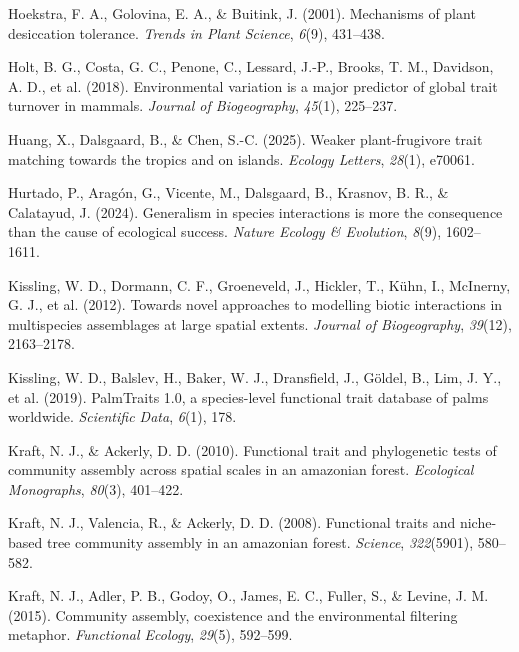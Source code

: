 \documentclass[
]{agujournal2019}
\newlength{\cslhangindent}
\newenvironment{CSLReferences}[2] %
 {\begin{list}{}{%
  \setlength{\itemindent}{0pt}
  \setlength{\leftmargin}{0pt}
  \setlength{\parsep}{0pt}
  \ifodd #1
   \setlength{\leftmargin}{\cslhangindent}
   \setlength{\itemindent}{-1\cslhangindent}
  \fi
  \setlength{\itemsep}{#2\baselineskip}}}
 {\end{list}}
\begin{document}
\begin{CSLReferences}{1}{0}
Hoekstra, F. A., Golovina, E. A., \& Buitink, J. (2001). Mechanisms of
plant desiccation tolerance. \emph{Trends in Plant Science},
\emph{6}(9), 431--438.

Holt, B. G., Costa, G. C., Penone, C., Lessard, J.-P., Brooks, T. M.,
Davidson, A. D., et al. (2018). Environmental variation is a major
predictor of global trait turnover in mammals. \emph{Journal of
Biogeography}, \emph{45}(1), 225--237.

Huang, X., Dalsgaard, B., \& Chen, S.-C. (2025). Weaker plant-frugivore
trait matching towards the tropics and on islands. \emph{Ecology
Letters}, \emph{28}(1), e70061.

Hurtado, P., Aragón, G., Vicente, M., Dalsgaard, B., Krasnov, B. R., \&
Calatayud, J. (2024). Generalism in species interactions is more the
consequence than the cause of ecological success. \emph{Nature Ecology
\& Evolution}, \emph{8}(9), 1602--1611.

Kissling, W. D., Dormann, C. F., Groeneveld, J., Hickler, T., Kühn, I.,
McInerny, G. J., et al. (2012). Towards novel approaches to modelling
biotic interactions in multispecies assemblages at large spatial
extents. \emph{Journal of Biogeography}, \emph{39}(12), 2163--2178.

Kissling, W. D., Balslev, H., Baker, W. J., Dransfield, J., Göldel, B.,
Lim, J. Y., et al. (2019). PalmTraits 1.0, a species-level functional
trait database of palms worldwide. \emph{Scientific Data}, \emph{6}(1),
178.

Kraft, N. J., \& Ackerly, D. D. (2010). Functional trait and
phylogenetic tests of community assembly across spatial scales in an
amazonian forest. \emph{Ecological Monographs}, \emph{80}(3), 401--422.

Kraft, N. J., Valencia, R., \& Ackerly, D. D. (2008). Functional traits
and niche-based tree community assembly in an amazonian forest.
\emph{Science}, \emph{322}(5901), 580--582.

Kraft, N. J., Adler, P. B., Godoy, O., James, E. C., Fuller, S., \&
Levine, J. M. (2015). Community assembly, coexistence and the
environmental filtering metaphor. \emph{Functional Ecology},
\emph{29}(5), 592--599.


\end{CSLReferences}
\end{document}
